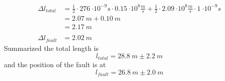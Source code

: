         \begin{align*}
            \Delta l_{total}&=\frac{1}{2} \cdot\SI{276}{\cdot 10^{-9}s}\cdot \SI{0.15}{\cdot 10^8\frac{m}{s}}  + \frac{1}{2}\cdot \SI{2.09}{\cdot 10^8\frac{m}{s}} \cdot\SI{1}{\cdot 10^{-9}s}\\
            &=\SI{2.07}{m}+\SI{0.10}{m}\\
            &=\SI{2.17}{m}\\
            \\
            \Delta l_{fault}&=\SI{2.02}{m}
        \end{align*}
        Summarized the total length is
        \begin{equation}
            l_{total}=\SI{28.8}{m} \pm \SI{2.2}{m}
        \end{equation}
        and the position of the fault is at
        \begin{equation}
            l_{fault}=\SI{26.8}{m} \pm \SI{2.0}{m}
        \end{equation}